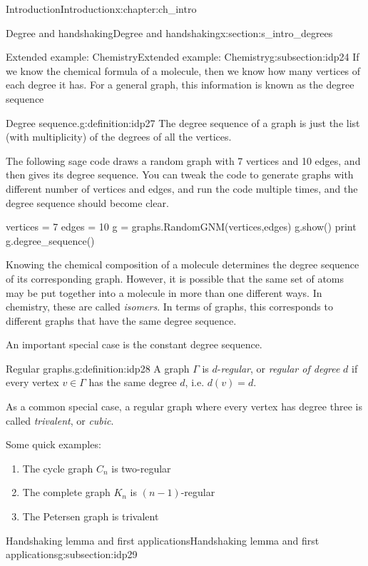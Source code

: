 \documentclass[oneside,10pt,]{book}
\numberwithin{equation}{section}
\begin{document}
\begin{chapterptx}{Introduction}{}{Introduction}{}{}{x:chapter:ch_intro}
\begin{sectionptx}{Degree and handshaking}{}{Degree and handshaking}{}{}{x:section:s_intro_degrees}
\begin{subsectionptx}{Extended example: Chemistry}{}{Extended example: Chemistry}{}{}{g:subsection:idp24}
If we know the chemical formula of a molecule, then we know how many vertices of each degree it has.  For a general graph, this information is known as the degree sequence%
\begin{definition}{Degree sequence.}{g:definition:idp27}%
The degree sequence of a graph is just the list (with multiplicity) of the degrees of all the vertices.%
\end{definition}
The following sage code draws a random graph with 7 vertices and 10 edges, and then gives its degree sequence.  You can tweak the code to generate graphs with different number of vertices and edges, and run the code multiple times, and the degree sequence should become clear.%
\begin{sageinput}
vertices = 7
edges = 10
g = graphs.RandomGNM(vertices,edges)
g.show()
print g.degree_sequence()
\end{sageinput}
Knowing the chemical composition of a molecule determines the degree sequence of its corresponding graph. However, it is possible that the same set of atoms may be put together into a molecule in more than one different ways. In chemistry, these are called \emph{isomers}.  In terms of graphs, this corresponds to different graphs that have the same degree sequence.%
\par
An important special case is the constant degree sequence.%
\begin{definition}{Regular graphs.}{g:definition:idp28}%
A graph \(\Gamma\) is \(d\)-\emph{regular}, or \emph{regular of degree} \(d\) if every vertex \(v\in\Gamma\) has the same degree \(d\), i.e. \(d(v)=d\).%
\end{definition}
As a common special case, a regular graph where every vertex has degree three is called \emph{trivalent}, or \emph{cubic}.%
\par
Some quick examples:%
\begin{enumerate}
\item{}The cycle graph \(C_n\) is two-regular%
\item{}The complete graph \(K_n\) is \((n-1)\)-regular%
\item{}The Petersen graph is trivalent%
\end{enumerate}
%
\end{subsectionptx}
%
%
\typeout{************************************************}
\typeout{************************************************}
%
\begin{subsectionptx}{Handshaking lemma and first applications}{}{Handshaking lemma and first applications}{}{}{g:subsection:idp29}

\end{subsectionptx}
\end{sectionptx}
\end{chapterptx}
\end{document}
